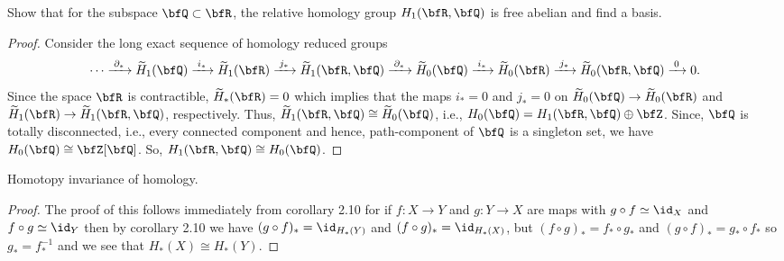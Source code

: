 \begin{problem}[Hatcher {\S}2.1, Ex.\,18]
Show that for the subspace $\bfQ\subset\bfR$, the relative homology group
$H_1(\bfR,\bfQ)$ is free abelian and find a basis.
\end{problem}
\begin{proof}
Consider the long exact sequence of homology reduced groups
\begin{equation}
  \label{eq:relative-short-exact-sequence-3}
\cdots\xrightarrow{\;\partial_*\;}
\widetilde H_1(\bfQ)\xrightarrow{\;i_*\;}
\widetilde H_1(\bfR)\xrightarrow{\;j_*\;}
\widetilde H_1(\bfR,\bfQ)\xrightarrow{\;\partial_*\;}
\widetilde H_0(\bfQ)\xrightarrow{\;i_*\;}
\widetilde H_0(\bfR)\xrightarrow{\;j_*\;}
\widetilde H_0(\bfR,\bfQ)\xrightarrow{\;0\;}0.
\end{equation}
Since the space $\bfR$ is contractible, $\widetilde H_*(\bfR)=0$ which
implies that the maps $i_*=0$ and $j_*=0$ on $\widetilde
H_0(\bfQ)\to\widetilde H_0(\bfR)$ and $\widetilde H_1(\bfR)\to\widetilde
H_1(\bfR,\bfQ)$, respectively. Thus, $\widetilde
H_1(\bfR,\bfQ)\cong\widetilde H_0(\bfQ)$, i.e.,
$H_0(\bfQ)=H_1(\bfR,\bfQ)\oplus\bfZ$. Since, $\bfQ$ is totally
disconnected, i.e., every connected component and hence, path-component of
$\bfQ$ is a singleton set, we have $H_0(\bfQ)\cong \bfZ[\bfQ]$. So,
$H_1(\bfR,\bfQ)\cong H_0(\bfQ)$.
\end{proof}

\newpage
\begin{problem}
Homotopy invariance of homology.
\end{problem}
\begin{proof}
The proof of this follows immediately from corollary 2.10 for if $f\colon
X\to Y$ and $g\colon Y\to X$ are maps with $g\circ f\simeq\id_X$ and
$f\circ g\simeq \id_Y$ then by corollary 2.10 we have $(g\circ
f)_*=\id_{H_*(Y)}$ and $(f\circ g)_*=\id_{H_*(X)}$, but $(f\circ
g)_*=f_*\circ g_*$ and $(g\circ f)_*=g_*\circ f_*$ so $g_*=f_*^{-1}$ and we
see that $H_*(X)\cong H_*(Y)$.
\end{proof}

